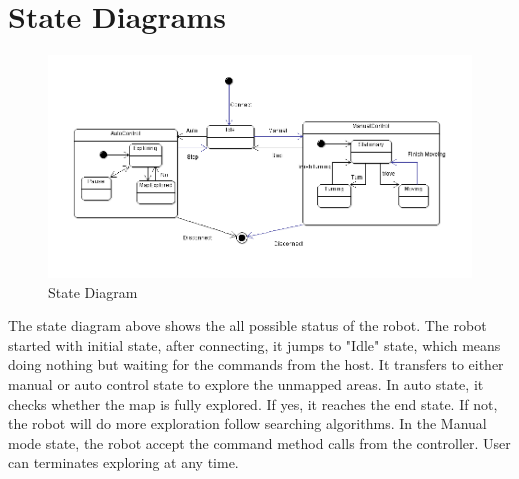 \documentclass[11pt, a4paper]{report}
\begin{document}
\section{State Diagrams}
\begin{figure}[h]
  \centering
    \includegraphics[width=16cm]{SEP_13_State_Diagram.png} 
  \caption{State Diagram}
\end{figure}
The state diagram above shows the all possible status of the robot. The robot started with initial state, after connecting, it jumps to "Idle" state, which means doing nothing but waiting for the commands from the host. It transfers to either manual or auto control state to explore the unmapped areas. In auto state, it checks whether the map is fully explored. If yes, it reaches the end state. If not, the robot will do more exploration follow searching algorithms. In the Manual mode state, the robot accept the command method calls from the controller. User can terminates exploring at any time.
\newpage
\end{document}

